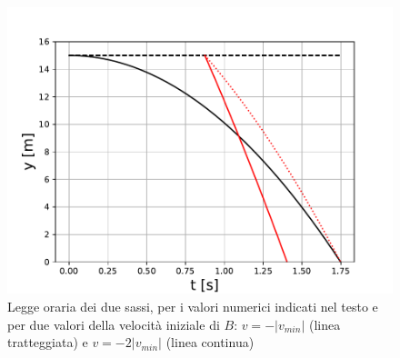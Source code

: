 \documentclass[12pt,a4paper]{book}
\begin{document}
 \begin{figure}[!ht]
 \centering
\includegraphics[scale=0.55]{sasso.pdf}
\caption{Legge oraria dei due sassi, per i valori numerici indicati nel testo e per due valori della velocità iniziale di $B$: $v=-|v_{min}|$ (linea tratteggiata) e $v=-2|v_{min}|$ (linea continua)}\label{fig:sasso} 
\end{figure}
\end{document}
